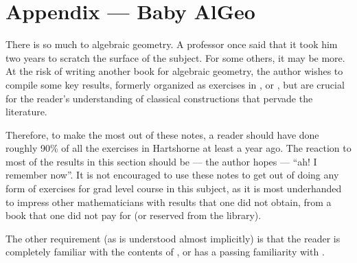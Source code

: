 \appendix
\chapter{Appendix --- Baby AlGeo}

There is so much to algebraic geometry. A professor once said that 
it took him two years to scratch the surface of the subject. For 
some others, it may be more. At the risk of writing another book
for algebraic geometry, the author wishes to compile some key 
results, formerly organized as exercises in \cite{Hart}, 
\cite{Liu} or \cite{Mum}, but are crucial for the reader's 
understanding of classical constructions that pervade the 
literature.

Therefore, to make the most out of these notes, a reader should
have done roughly 90\% of all the exercises in Hartshorne at least 
a year ago. The reaction to most of the results in this section 
should be --- the author hopes --- ``ah! I remember now''. It is 
not encouraged to use these notes to get out of doing any form of 
exercises for grad level course in this subject, as it is most
underhanded to impress other mathematicians with results that one 
did not obtain, from a book that one did not pay for (or reserved 
from the library).

The other requirement (as is understood almost implicitly) is that
the reader is completely familiar with the contents of \cite{AM},
or has a passing familiarity with \cite{MatsCA}.






